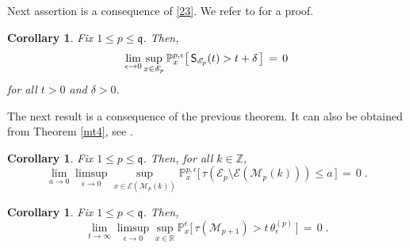 \documentclass[reqno]{amsart}
\theoremstyle{plain}
\newtheorem{corollary}[theorem]{Corollary}
\theoremstyle{definition}
\newcommand{\mf}[1]{{\mathfrak #1}}
\newcommand{\bb}[1]{{\mathbb #1}}
\newcommand{\ms}[1]{{\mathscr #1}}
\newcommand{\mss}[1]{{\textsf #1}}
\newcounter{as}[section]
\newcommand{\<}{\langle}
\renewcommand{\>}{\rangle}
\begin{document}
Next assertion is a consequence of \eqref{23}.  We refer to
\cite[display (3.2)]{llm} for a proof.

\begin{corollary}
\label{l37}
Fix $1\le p\le \mf q$. Then,
\begin{equation*}
\lim_{\epsilon \to 0} 
\sup_{x\in \ms E_p} 
\bb P^{p,\epsilon}_{x}\big[\, \mss S_{\ms E_p} (t)
> t+\delta\,\big] \,=\, 0
\end{equation*}
for all $t>0$ and $\delta > 0$.
\end{corollary}

The next result is a consequence of the previous theorem. It can also
be obtained from Theorem \ref{mt4}, see \cite[Lemma 4.2]{lms}.

\begin{corollary}
\label{l07}
Fix $1\le p\le \mf q$. Then, for all $k\in\bb Z$,
\begin{equation*}
\lim_{a \to 0} \limsup_{\epsilon \to 0} 
\sup_{x\in \ms E(\ms M_p(k))} 
\bb P^{p,\epsilon}_{x}\big[\, \tau(\ms E_p \setminus \ms E(\ms M_p(k)))
\le  a  \,\big] \,=\, 0\;.
\end{equation*}
\end{corollary}

\begin{corollary}
\label{l40}
Fix $1\le p< \mf q$. Then,
\begin{equation*}
\lim_{t\to\infty}\limsup_{\epsilon\to 0}
\sup_{x\in \bb R} \bb P^{\epsilon}_x\big[ \, 
\tau (\ms M_{p+1}) > t \, \theta^{(p)}_\epsilon  \, \big] \,=\, 0\;.
\end{equation*}
\end{corollary}
\end{document}
